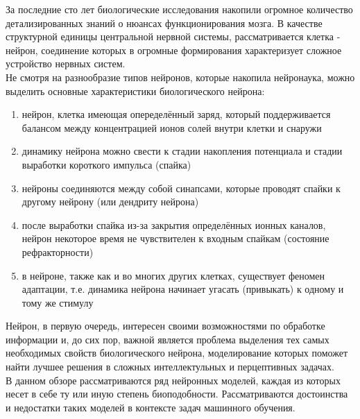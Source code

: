     \indent За последние сто лет биологические исследования накопили огромное количество детализированных знаний о нюансах функционирования мозга. В качестве структурной единицы центральной нервной системы, рассматривается клетка - нейрон, соединение которых в огромные формирования характеризует сложное  устройство нервных систем.\\
    \indent Не смотря на разнообразие типов нейронов, которые накопила нейронаука, можно выделить основные характеристики биологического нейрона:
    \begin{enumerate}
    \item нейрон, клетка имеющая опеределённый заряд, который поддерживается балансом между концентрацией ионов солей внутри клетки и снаружи
    \item динамику нейрона можно свести к стадии накопления потенциала и стадии выработки короткого импульса     (спайка)
    \item нейроны соединяются между собой синапсами, которые проводят спайки к другому нейрону (или дендриту нейрона)
    \item после выработки спайка из-за закрытия определённых ионных каналов, нейрон некоторое время не чувствителен к входным спайкам (состояние рефракторности)
    \item в нейроне, также как и во многих других клетках, существует феномен адаптации, т.е. динамика нейрона начинает угасать (привыкать) к одному и тому же стимулу
    \end{enumerate}
    Нейрон, в первую очередь, интересен своими возможностями по обработке информации и, до сих пор, важной является проблема выделения тех самых необходимых свойств биологического нейрона, моделирование которых поможет найти лучшее решения в сложных интеллектульных и перцептивных задачах.\\
    \indent В данном обзоре рассматриваются ряд нейронных моделей, каждая из которых несет в себе ту или иную степень биоподобности. Рассматриваются достоинства и недостатки таких моделей в контексте задач машинного обучения.
